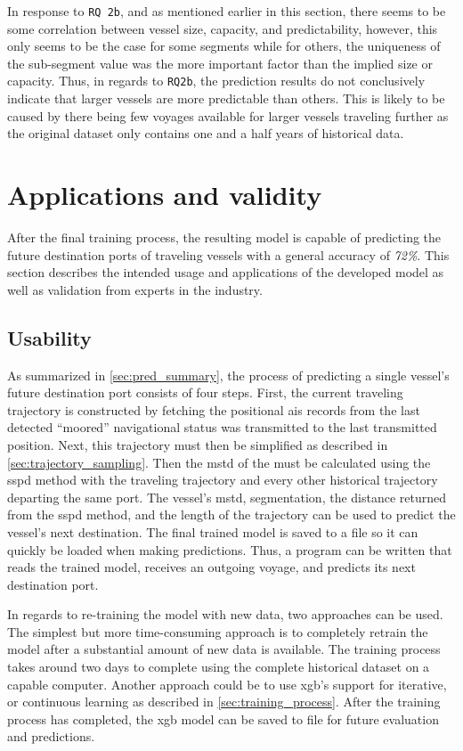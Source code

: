 In response to \texttt{RQ 2b}, and as mentioned earlier in this section, there seems to be some correlation between vessel size, capacity, and predictability, however, this only seems to be the case for some segments while for others, the uniqueness of the sub-segment value was the more important factor than the implied size or capacity. Thus, in regards to \texttt{RQ2b}, the prediction results do not conclusively indicate that larger vessels are more predictable than others. This is likely to be caused by there being few voyages available for larger vessels traveling further as the original dataset only contains one and a half years of historical data.

\section{Applications and validity}

After the final training process, the resulting model is capable of predicting the future destination ports of traveling vessels with a general accuracy of \textit{72\%}. This section describes the intended usage and applications of the developed model as well as validation from experts in the industry.

\subsection{Usability}
\label{sec:usability}

As summarized in \cref{sec:pred_summary}, the process of predicting a single vessel's future destination port consists of four steps. First, the current traveling trajectory is constructed by fetching the positional \acrshort{ais} records from the last detected ``moored'' navigational status was transmitted to the last transmitted position. Next, this trajectory must then be simplified as described in \cref{sec:trajectory_sampling}. Then the \acrfull{mstd} of the must be calculated using the \acrshort{sspd} method with the traveling trajectory and every other historical trajectory departing the same port. The vessel's \acrshort{mstd}, segmentation, the distance returned from the \acrshort{sspd} method, and the length of the trajectory can be used to predict the vessel's next destination. The final trained model is saved to a file so it can quickly be loaded when making predictions. Thus, a program can be written that reads the trained model, receives an outgoing voyage, and predicts its next destination port.

In regards to re-training the model with new data, two approaches can be used. The simplest but more time-consuming approach is to completely retrain the model after a substantial amount of new data is available. The training process takes around two days to complete using the complete historical dataset on a capable computer. Another approach could be to use \acrfull{xgb}'s support for iterative, or continuous learning as described in \cref{sec:training_process}. After the training process has completed, the \acrshort{xgb} model can be saved to file for future evaluation and predictions.

